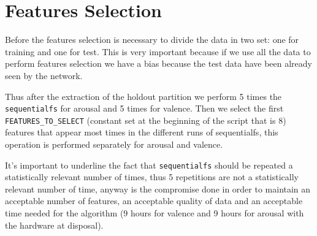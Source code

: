 \documentclass[a4paper]{report}
\begin{document}
	\section{Features Selection}
	\noindent Before the features selection is necessary to divide the data in two set: one for training and one for test. This is very important because if we use all the data to perform features selection we have a bias because the test data have been already seen by the network.
	
	\noindent Thus after the extraction of the holdout partition we perform 5 times the \texttt{sequentialfs} for arousal and 5 times for valence. Then we select the first \texttt{FEATURES\_TO\_SELECT} (constant set at the beginning of the script that is 8) features that appear most times in the different runs of sequentialfs, this operation is performed separately for arousal and valence.
	
	\noindent It's important to underline the fact that \texttt{sequentialfs} should be repeated a statistically relevant number of times, thus 5 repetitions are not a statistically relevant number of time, anyway is the compromise done in order to maintain an acceptable number of features, an acceptable quality of data and an acceptable time needed for the algorithm (9 hours for valence and 9 hours for arousal with the hardware at disposal).
	
\end{document}

